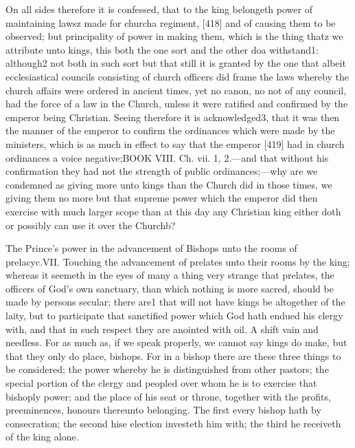 On all sides therefore it is confessed, that to the king belongeth power of maintaining lawsz made for churcha regiment, [418] and of causing them to be observed; but principality of power in making them, which is the thing thatz we attribute unto kings, this both the one sort and the other doa withstand1: although2 not both in such sort but that still it is granted by the one that albeit ecclesiastical councils consisting of church officers did frame the laws whereby the church affairs were ordered in ancient times, yet no canon, no not of any council, had the force of a law in the Church, unless it were ratified and confirmed by the emperor being Christian. Seeing therefore it is acknowledged3, that it was then the manner of the emperor to confirm the ordinances which were made by the ministers, which is as much in effect to say that the emperor [419] had in church ordinances a voice negative;BOOK VIII. Ch. vii. 1, 2.—and that without his confirmation they had not the strength of public ordinances;—why are we condemned as giving more unto kings than the Church did in those times, we giving them no more but that supreme power which the emperor did then exercise with much larger scope than at this day any Christian king either doth or possibly can use it over the Churchb?

The Prince’s power in the advancement of Bishops unto the rooms of prelacyc.VII. Touching the advancement of prelates unto their rooms by the king; whereas it seemeth in the eyes of many a thing very strange that prelates, the officers of God’s own sanctuary, than which nothing is more sacred, should be made by persons secular; there are1 that will not have kings be altogether of the laity, but to participate that sanctified power which God hath endued his clergy with, and that in such respect they are anointed with oil. A shift vain and needless. For as much as, if we speak properly, we cannot say kings do make, but that they only do place, bishops. For in a bishop there are these three things to be considered; the power whereby he is distinguished from other pastors; the special portion of the clergy and peopled over whom he is to exercise that bishoply power; and the place of his seat or throne, together with the profits, preeminences, honours thereunto belonging. The first every bishop hath by consecration; the second hise election investeth him with; the third he receiveth of the king alone.


